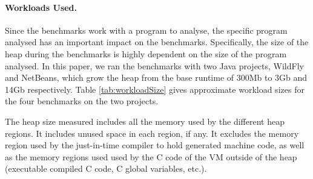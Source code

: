 \documentclass[sigplan,10pt,screen]{acmart}\settopmatter{printfolios=true,printccs=true,printacmref=true}
\newcommand{\todo}[1]{\color{orange}\fbox{\bfseries\sffamily\scriptsize TODO:}{\sf\small$\blacktriangleright$\textit{#1}$\blacktriangleleft$}\color{black}}
\def\ie{\emph{i.e., }}
\begin{document}



\paragraph{Workloads Used.} Since the benchmarks work with a program to analyse, the specific program analysed has an important impact on the benchmarks. Specifically, the size of the heap during the benchmarks is highly dependent on the size of the program analysed. In this paper, we ran the benchmarks with two Java projects, WildFly and NetBeans, which grow the heap from the base runtime of 300Mb to 3Gb and 14Gb respectively. Table \ref{tab:workloadSize} gives approximate workload sizes for the four benchmarks on the two projects. 

The heap size measured includes all the memory used by the different heap regions. It includes unused space in each region, if any. It excludes the memory region used by the just-in-time compiler to hold generated machine code, as well as the memory regions used used by the C code of the VM outside of the heap (executable compiled C code, C global variables, etc.).
\end{document}
